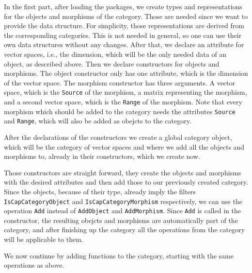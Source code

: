 In the first part, after loading the packages, we create types and representations for the objects
and morphisms of the category. Those are needed since we want to provide the data structure. For simplicity,
those representations are derived from the corresponding \CapPkg \GAP categories. This is not needed in general,
so one can use their own data structures without any changes. After that, we declare an attribute for vector spaces,
i.e., the dimension, which will be the only needed data of an object, as described above. Then we declare constructors
for objects and morphisms. The object constructor only has one attribute, which is the dimension of the vector space.
The morphism constructor has three arguments. A vector space, which is the \texttt{Source} of the morphism, a matrix
representing the morphism, and a second vector space, which is the \texttt{Range} of the morphism. Note that every morphism
which should be added to the category needs the \GAP attributes \texttt{Source} and \texttt{Range}, which will also be
added as obejcts to the category.



After the declarations of the constructors we create a global category \GAP object, which will be the category
of vector spaces and where we add all the objects and morphisms to, already in their constructors, which we create now.



Those constructors are straight forward, they create the objects and morphisms with the desired attributes and then
add those to our previously created category. Since the objects, because of their type, already imply the \GAP filters
\texttt{IsCapCategoryObject} and \texttt{IsCapCategoryMorphism} respectively, we can use the operation \texttt{Add} instead
of \texttt{AddObject} and \texttt{AddMorphism}. Since \texttt{Add} is called in the constructor, the resulting obejcts and
morphisms are automatically part of the category, and after finishing up the category all the operations from the
category will be applicable to them.

We now continue by adding functions to the category, starting with the same operations as above.



